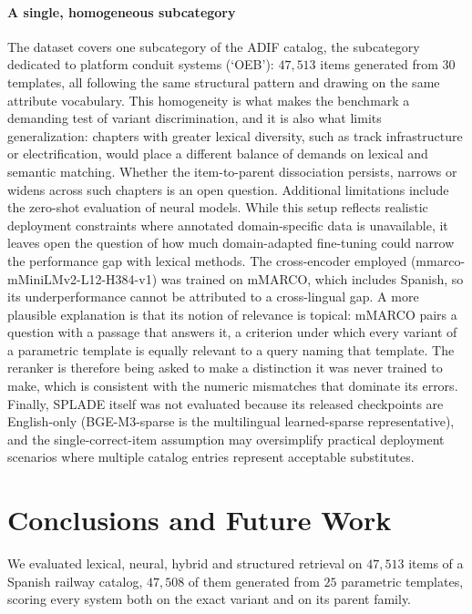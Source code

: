 \documentclass[preprint,review,12pt]{elsarticle}
\begin{document}
\paragraph{A single, homogeneous subcategory} The dataset covers one subcategory of the ADIF catalog, the subcategory dedicated to platform conduit systems (`OEB'): $47{,}513$ items generated from $30$ templates, all following the same structural pattern and drawing on the same attribute vocabulary. This homogeneity is what makes the benchmark a demanding test of variant discrimination, and it is also what limits generalization: chapters with greater lexical diversity, such as track infrastructure or electrification, would place a different balance of demands on lexical and semantic matching. Whether the item-to-parent dissociation persists, narrows or widens across such chapters is an open question.
Additional limitations include the zero-shot evaluation of neural models. While this setup reflects realistic deployment constraints where annotated domain-specific data is unavailable, it leaves open the question of how much domain-adapted fine-tuning could narrow the performance gap with lexical methods. The cross-encoder employed (mmarco-mMiniLMv2-L12-H384-v1) was trained on mMARCO, which includes Spanish, so its underperformance cannot be attributed to a cross-lingual gap. A more plausible explanation is that its notion of relevance is topical: mMARCO pairs a question with a passage that answers it, a criterion under which every variant of a parametric template is equally relevant to a query naming that template. The reranker is therefore being asked to make a distinction it was never trained to make, which is consistent with the numeric mismatches that dominate its errors. Finally, SPLADE itself was not evaluated because its released checkpoints are English-only (BGE-M3-sparse is the multilingual learned-sparse representative), and the single-correct-item assumption may oversimplify practical deployment scenarios where multiple catalog entries represent acceptable substitutes.



\section{Conclusions and Future Work}

We evaluated lexical, neural, hybrid and structured retrieval on $47{,}513$ items of a Spanish railway catalog, $47{,}508$ of them generated from $25$ parametric templates, scoring every system both on the exact variant and on its parent family.
\end{document}
